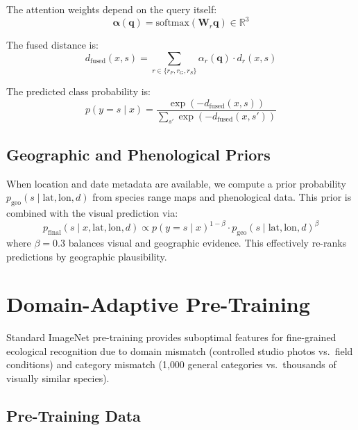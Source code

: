 \documentclass[11pt,a4paper]{article}
\newcommand{\R}{\mathbb{R}}
\begin{document}
The attention weights depend on the query itself:
\begin{equation}
  \boldsymbol{\alpha}(\mathbf{q}) = \text{softmax}(\mathbf{W}_r
  \mathbf{q}) \in \R^3
\end{equation}

The fused distance is:
\begin{equation}
  d_{\text{fused}}(x, s) = \sum_{r \in \{r_F, r_G, r_S\}}
  \alpha_r(\mathbf{q}) \cdot d_r(x, s)
\end{equation}

The predicted class probability is:
\begin{equation}
  p(y = s \mid x) = \frac{\exp(-d_{\text{fused}}(x, s))}
  {\sum_{s'} \exp(-d_{\text{fused}}(x, s'))}
  \label{eq:prediction}
\end{equation}

\subsection{Geographic and Phenological Priors}

When location and date metadata are available, we compute a prior
probability $p_{\text{geo}}(s \mid \text{lat}, \text{lon}, d)$ from
species range maps and phenological data. This prior is combined with
the visual prediction via:
\begin{equation}
  p_{\text{final}}(s \mid x, \text{lat}, \text{lon}, d) \propto
  p(y = s \mid x)^{1-\beta} \cdot
  p_{\text{geo}}(s \mid \text{lat}, \text{lon}, d)^{\beta}
\end{equation}
where $\beta = 0.3$ balances visual and geographic evidence. This
effectively re-ranks predictions by geographic plausibility.


\section{Domain-Adaptive Pre-Training}
\label{sec:pretraining}

Standard ImageNet pre-training provides suboptimal features for
fine-grained ecological recognition due to domain mismatch (controlled
studio photos vs.\ field conditions) and category mismatch (1{,}000
general categories vs.\ thousands of visually similar species).

\subsection{Pre-Training Data}
\end{document}
